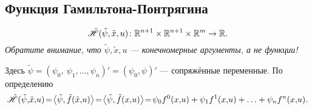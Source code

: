 \subsection*{Функция Гамильтона-Понтрягина}
$$
\tilde{\mathscr{H}}(\tilde{\psi}, \tilde{x}, u) \colon \mathbb{R}^{n+1} \times \mathbb{R}^{n+1} \times \mathbb{R}^m \to \mathbb{R}.
$$
\textit{Обратите внимание, что $\tilde{\psi}, \tilde{x}, u$ --- конечномерные аргументы, а не функции!}

Здесь $\tilde{\psi} = (\psi_0,\ \psi_1, \ldots, \psi_n)' = (\psi_0, \psi)'$ --- сопряжённые переменные. По определению
$$
\tilde{\mathscr{H}}(\tilde{\psi}, \! \tilde{x}, \! u) \! = \! \scalar{\tilde{\psi}}{\tilde{f}(\tilde{x},\!u)} \! = \! \scalar{\tilde{\psi}}{\tilde{f}(x,\!u)} \! = \! \psi_0 f^0(x,\!u) + \psi_1 f^1(x,\!u) + \ldots + \psi_n f^n(x,\!u).
$$